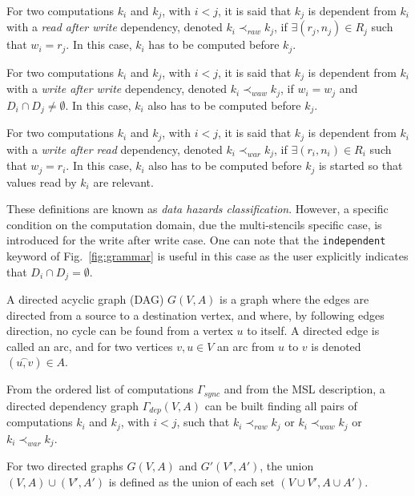 \begin{mydef}
For two computations $k_i$ and $k_j$, with $i < j$, it is said that $k_j$ is dependent from $k_i$ with a \emph{read after write} dependency, denoted $k_i \prec_{raw} k_j$, if $\exists (r_j,n_j) \in R_j$ such that $w_i=r_j$. In this case, $k_i$ has to be computed before $k_j$.
\end{mydef}

\begin{mydef}
For two computations $k_i$ and $k_j$, with $i < j$, it is said that $k_j$ is dependent from $k_i$ with a \emph{write after write} dependency, denoted $k_i \prec_{waw} k_j$, if $w_i = w_j$ and $D_i \cap D_j \neq \emptyset$. In this case, $k_i$ also has to be computed before $k_j$.
\end{mydef}

\begin{mydef}
For two computations $k_i$ and $k_j$, with $i < j$, it is said that $k_j$ is dependent from $k_i$ with a \emph{write after read} dependency, denoted $k_i \prec_{war} k_j$, if $\exists (r_i,n_i) \in R_i$ such that $w_j=r_i$. In this case, $k_i$ also has to be computed before $k_j$ is started so that values read by $k_i$ are relevant.
\end{mydef}

These definitions are known as \emph{data hazards classification}. However, a specific condition on the computation domain, due the multi-stencils specific case, is introduced for the write after write case. One can note that the \texttt{independent} keyword of Fig.~\ref{fig:grammar} is useful in this case as the user explicitly indicates that $D_i \cap D_j=\emptyset$.

\begin{mydef}
A directed acyclic graph (DAG) $G(V,A)$ is a graph where the edges are directed from a source to a destination vertex, and where, by following edges direction, no cycle can be found from a vertex $u$ to itself. A directed edge is called an arc, and for two vertices $v,u \in V$ an arc from $u$ to $v$ is denoted $(\overset{\frown}{u,v}) \in A$.
\end{mydef}

From the ordered list of computations $\Gamma_{sync}$ and from the MSL description, a directed dependency graph $\Gamma_{dep}(V,A)$ can be built finding all pairs of computations $k_i$ and $k_j$, with $i<j$, such that $k_i \prec_{raw} k_j$ or $k_i \prec_{waw} k_j$ or $k_i \prec_{war} k_j$. 

\begin{mydef}
For two directed graphs $G(V,A)$ and $G'(V',A')$, the union $(V,A)\cup (V',A')$ is defined as the union of each set $(V\cup V', A \cup A')$.
\end{mydef}

